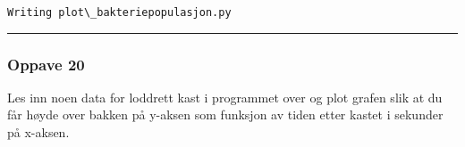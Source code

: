 \documentclass[11pt]{article}
\makeatletter
\newcommand{\boxspacing}{\kern\kvtcb@left@rule\kern\kvtcb@boxsep}
\newcommand{\prompt}[4]{
        \ttfamily\llap{{\color{#2}[#3]:\hspace{3pt}#4}}\vspace{-\baselineskip}
    }
\makeatother
\begin{document}
    \begin{Verbatim}[commandchars=\\\{\}]
Writing plot\_bakteriepopulasjon.py
    \end{Verbatim}

    \begin{center}\rule{0.5\linewidth}{\linethickness}\end{center}

    \hypertarget{oppave-20}{%
\subsubsection{Oppave 20}\label{oppave-20}}

Les inn noen data for loddrett kast i programmet over og plot grafen
slik at du får høyde over bakken på y-aksen som funksjon av tiden etter
kastet i sekunder på x-aksen.

    \begin{tcolorbox}[breakable, size=fbox, boxrule=1pt, pad at break*=1mm,colback=cellbackground, colframe=cellborder]
\prompt{In}{incolor}{ }{\boxspacing}
\begin{Verbatim}[commandchars=\\\{\}]

\end{Verbatim}
\end{tcolorbox}


    
    
    
\end{document}
